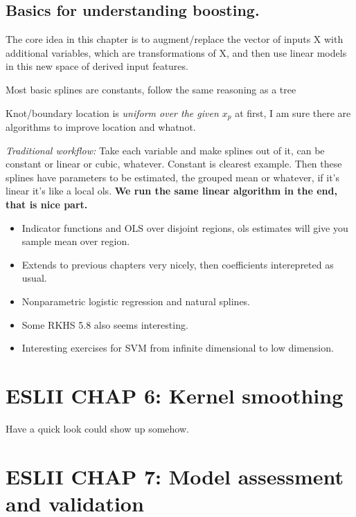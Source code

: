 \documentclass{article}
\begin{document}
\subsection*{Basics for understanding boosting.}
The core idea in this chapter is to augment/replace the
vector of inputs X with additional variables, which are transformations of
X, and then use linear models in this new space of derived input features.

Most basic splines are constants, follow the same reasoning as a tree 

Knot/boundary location is \textit{uniform over the given $x_p$} at first, I am sure there are algorithms to improve location and whatnot.

\textit{Traditional workflow:}
Take each variable and make splines out of it, can be constant or linear or cubic, whatever. Constant is clearest example.
Then these splines have parameters to be estimated, the grouped mean or whatever, if it's linear it's like a local ols.
\textbf{We run the same linear algorithm in the end, that is nice part.}

\begin{itemize}
    \item Indicator functions and OLS over disjoint regions, ols estimates will give 
    you sample mean over region.
    \item Extends to previous chapters very nicely, then coefficients interepreted as usual. 
    \item Nonparametric logistic regression and natural splines.
    \item Some RKHS 5.8 also seems interesting.
    \item Interesting exercises for SVM from infinite dimensional to low dimension.
\end{itemize}

\section*{ESLII CHAP 6: Kernel smoothing}
Have a quick look could show up somehow.



\section*{ESLII CHAP 7: Model assessment and validation}
\end{document}

